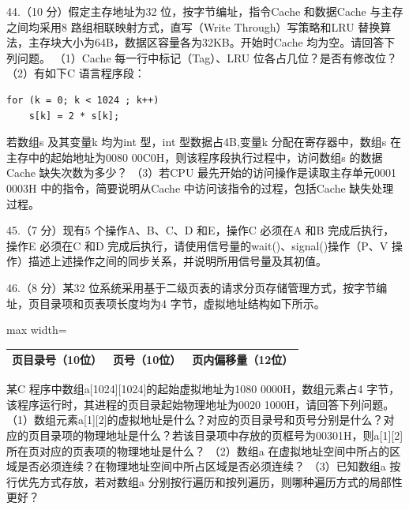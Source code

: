 \documentclass[UTF8,11pt]{ctexart}
\begin{document}
44.（10 分）假定主存地址为32 位，按字节编址，指令Cache 和数据Cache 与主存之间均采用8 路组相联映射方式，直写（Write Through）写策略和LRU 替换算法，主存块大小为64B，数据区容量各为32KB。开始时Cache 均为空。请回答下列问题。 （1）Cache 每一行中标记（Tag）、LRU 位各占几位？是否有修改位？ （2）有如下C 语言程序段：


\begin{Verbatim}[breaklines,breakanywhere,fontsize=\small]
for (k = 0; k < 1024 ; k++)
    s[k] = 2 * s[k];
\end{Verbatim}

若数组s 及其变量k 均为int 型，int 型数据占4B,变量k 分配在寄存器中，数组s 在主存中的起始地址为0080 00C0H，则该程序段执行过程中，访问数组s 的数据Cache 缺失次数为多少？ （3）若CPU 最先开始的访问操作是读取主存单元0001 0003H 中的指令，简要说明从Cache 中访问该指令的过程，包括Cache 缺失处理过程。


45.（7 分）现有5 个操作A、B、C、D 和E，操作C 必须在A 和B 完成后执行，操作E 必须在C 和D 完成后执行，请使用信号量的wait()、signal()操作（P、V 操作）描述上述操作之间的同步关系，并说明所用信号量及其初值。


46.（8 分）某32 位系统采用基于二级页表的请求分页存储管理方式，按字节编址，页目录项和页表项长度均为4 字节，虚拟地址结构如下所示。 


\begin{center}\begin{adjustbox}{max width=\linewidth}\begin{tabular}{|>{\raggedright\arraybackslash}p{\dimexpr(\linewidth-6\tabcolsep-4\arrayrulewidth)/3\relax}|>{\raggedright\arraybackslash}p{\dimexpr(\linewidth-6\tabcolsep-4\arrayrulewidth)/3\relax}|>{\raggedright\arraybackslash}p{\dimexpr(\linewidth-6\tabcolsep-4\arrayrulewidth)/3\relax}|}\hline
页目录号（10位） & 页号（10位） & 页内偏移量（12位）\\\hline\end{tabular}\end{adjustbox}\end{center}

某C 程序中数组a[1024][1024]的起始虚拟地址为1080 0000H，数组元素占4 字节，该程序运行时，其进程的页目录起始物理地址为0020 1000H，请回答下列问题。 （1）数组元素a[1][2]的虚拟地址是什么？对应的页目录号和页号分别是什么？对应的页目录项的物理地址是什么？若该目录项中存放的页框号为00301H，则a[1][2]所在页对应的页表项的物理地址是什么？ （2）数组a 在虚拟地址空间中所占的区域是否必须连续？在物理地址空间中所占区域是否必须连续？ （3）已知数组a 按行优先方式存放，若对数组a 分别按行遍历和按列遍历，则哪种遍历方式的局部性更好？
\end{document}
